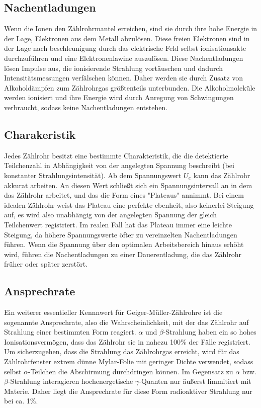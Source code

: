 \documentclass{scrartcl}
\begin{document}
\subsection{Nachentladungen}
Wenn die Ionen den Zählrohrmantel erreichen, sind sie durch ihre hohe Energie in der Lage, Elektronen aus dem Metall abzulösen. Diese freien Elektronen sind in der Lage nach beschleunigung durch das elektrische Feld selbst ionisationsakte durchzuführen und eine Elektronenlawine auszulösen. Diese Nachentladungen lösen Impulse aus, die ionisierende Strahlung vortäuschen und dadurch Intensitätsmessungen verfälschen können. Daher werden sie durch Zusatz von Alkoholdämpfen zum Zählrohrgas größtenteils unterbunden. Die Alkoholmoleküle werden ionisiert und ihre Energie wird durch Anregung von Schwingungen verbraucht, sodass keine Nachentladungen entstehen.
\subsection{Charakeristik}
Jedes Zählrohr besitzt eine bestimmte Charakteristik, die die detektierte Teilchenzahl in Abhängigkeit von der angelegten Spannung beschreibt (bei konstanter Strahlungsintensität). Ab dem Spannungswert $U_e$ kann das Zählrohr akkurat arbeiten. An diesen Wert schließt sich ein Spannungsintervall an in dem das Zählrohr arbeitet, und das die Form eines "Plateaus"  annimmt. Bei einem idealen Zählrohr weist das Plateau eine perfekte ebenheit, also keinerlei Steigung auf, es wird also unabhängig von der angelegten Spannung der gleich Teilchenwert registriert. Im realen Fall hat das Plateau immer eine leichte Steigung, da höhere Spannungswerte öfter zu vereinzelten Nachentladungen führen. Wenn die Spannung über den optimalen Arbeitsbereich hinaus erhöht wird, führen die Nachentladungen zu einer Dauerentladung, die das Zählrohr früher oder später zerstört.
\subsection{Ansprechrate}
Ein weiterer essentieller Kennnwert für Geiger-Müller-Zählrohre ist die sogenannte Ansprechrate, also die Wahrscheinlichkeit, mit der das Zählrohr auf Strahlung einer bestimmten Form reagiert. $\alpha$ und $\beta$-Strahlung haben ein so hohes Ionisationsvermögen, dass das Zählrohr sie in nahezu 100\% der Fälle registriert. Um sicherzugehen, dass die Strahlung das Zählrohrgas erreicht, wird für das Zählrohrfenster extrem dünne Mylar-Folie mit geringer Dichte verwendet, sodass selbst $\alpha$-Teilchen die Abschirmung durchdringen können. Im Gegensatz zu $\alpha$ bzw. $\beta$-Strahlung interagieren hochenergetische $\gamma$-Quanten nur äußerst limmitiert mit Materie. Daher liegt die Ansprechrate für diese Form radioaktiver Strahlung nur bei ca. 1\%.
\end{document}
